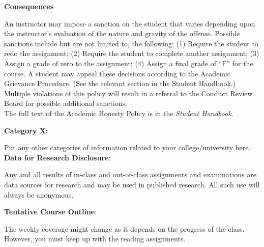 \documentclass[11pt]{article}
\begin{document}
\textbf{Consequences}

\hspace{3mm}
\hangindent=5mm An instructor may impose a sanction on the student that varies depending upon the instructor's evaluation of the nature and gravity of the offense.  Possible sanctions include but are not limited to, the following: (1) Require the student to redo the assignment; (2) Require the student to complete another assignment; (3) Assign a grade of zero to the assignment; (4) Assign a final grade of ``F'' for the course. A student may appeal these decisions according to the Academic Grievance Procedure. (See the relevant section in the Student Handbook.) Multiple violations of this policy will result in a referral to the Conduct Review Board for possible additional sanctions. \\

The full text of the Academic Honesty Policy is in the \emph{Student Handbook}.

\newpage

\textbf {\large Category X:}

\hspace{3mm}
\hangindent=5mm Put any other categories of information related to your college/university here. \\

\textbf {\large Data for Research Disclosure}:

Any and all results of in-class and out-of-class assignments and examinations are data sources for research and may be used in published research. All such use will always be anonymous.

\newpage

\textbf {\large Tentative Course Outline}:

The weekly coverage might change as it depends on the progress of the class.  However, you must keep up with the reading assignments.
\end{document}
